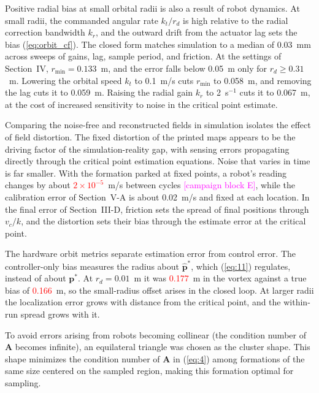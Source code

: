 \documentclass[lettersize,journal]{IEEEtran}
\newcommand{\syn}[1]{\textcolor{red}{#1}}            %
\newcommand{\rev}[1]{#1}                             %
\newcommand{\open}[1]{\textcolor{magenta}{[#1]}}     %
\begin{document}
Positive radial bias at small orbital radii is also a result of robot dynamics. At small radii, the commanded angular rate $k_t / r_d$ is high relative to the radial correction bandwidth $k_r$, and the outward drift from the actuator lag sets the bias (\ref{eq:orbit_cf}). The closed form matches simulation to a median of \rev{0.03}~mm across sweeps of gains, lag, sample period, and friction. At the settings of Section~IV, $r_{\min} = \rev{0.133}$~m, and the error falls below 0.05~m only for $r_d \ge \rev{0.31}$~m. Lowering the orbital speed $k_t$ to 0.1~m/s cuts $r_{\min}$ to \rev{0.058}~m, and removing the lag cuts it to \rev{0.059}~m. Raising the radial gain $k_r$ to 2~s$^{-1}$ cuts it to \rev{0.067}~m, at the cost of increased sensitivity to noise in the critical point estimate. %

Comparing the noise-free and reconstructed fields in simulation isolates the effect of field distortion. The fixed distortion of the printed maps appears to be the driving factor of the simulation-reality gap, with sensing errors propagating directly through the critical point estimation equations. Noise that varies in time is far smaller. With the formation parked at fixed points, a robot's reading changes by about \syn{$2\times10^{-5}$}~m/s between cycles \open{campaign block E}, while the calibration error of Section~V-A is about 0.02~m/s and fixed at each location. In the final error of Section~III-D, friction sets the spread of final positions through $v_c/k$, and the distortion sets their bias through the estimate error at the critical point. %

The hardware orbit metrics separate estimation error from control error. The controller-only bias measures the radius about $\hat{\mathbf{p}}^*$, which (\ref{eq:11}) regulates, instead of about $\mathbf{p}^*$. At $r_d = 0.01$~m it was \syn{0.177}~m in the vortex against a true bias of \syn{0.166}~m, so the small-radius offset arises in the closed loop. At larger radii the localization error grows with distance from the critical point, and the within-run spread grows with it. %

To avoid errors arising from robots becoming collinear (the condition number of $\mathbf{A}$ becomes infinite), an equilateral triangle was chosen as the cluster shape. This shape minimizes the condition number of $\mathbf{A}$ in (\ref{eq:4}) among formations of the same size centered on the sampled region, making this formation optimal for sampling.
\end{document}
